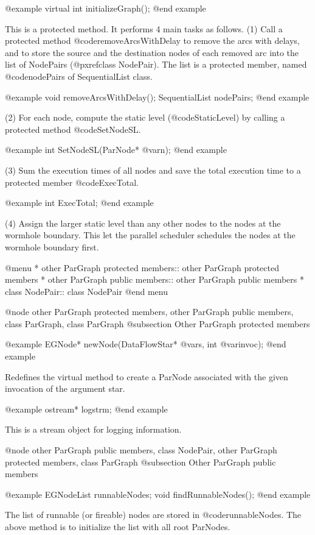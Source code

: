 @example
virtual int initializeGraph();
@end example

This is a protected method. It performs 4 main tasks as follows.
(1) Call a protected method @code{removeArcsWithDelay} to remove 
the arcs with delays, and to store the source and the
destination nodes of each removed arc into the list of NodePairs
(@pxref{class NodePair}). The list is a protected member, named
@code{nodePairs} of SequentialList class.

@example
void removeArcsWithDelay();
SequentialList nodePairs;
@end example

(2) For each node, compute the static level (@code{StaticLevel}) by calling
a protected method @code{SetNodeSL}. 

@example
int SetNodeSL(ParNode* @var{n});
@end example

(3) Sum the execution times of all nodes and save the total execution time
to a protected member @code{ExecTotal}.

@example
int ExecTotal;
@end example

(4) Assign the larger static level than any other nodes to the nodes at
the wormhole boundary. This let the parallel scheduler schedules the
nodes at the wormhole boundary first.

@menu
* other ParGraph protected members::	other ParGraph protected members
* other ParGraph public members::	other ParGraph public members
* class NodePair::			class NodePair
@end menu

@node other ParGraph protected members, other ParGraph public members, class ParGraph, class ParGraph
@subsection Other ParGraph protected members

@example
EGNode* newNode(DataFlowStar* @var{s}, int @var{invoc});
@end example

Redefines the virtual method to create a ParNode associated with the
given invocation of the argument star.

@example
ostream* logstrm;
@end example

This is a stream object for logging information.

@node other ParGraph public members, class NodePair, other ParGraph protected members, class ParGraph
@subsection Other ParGraph public members

@example
EGNodeList runnableNodes;
void findRunnableNodes();
@end example

The list of runnable (or fireable) nodes are stored in @code{runnableNodes}.
The above method is to initialize the list with all root ParNodes.

